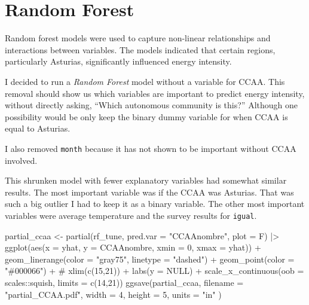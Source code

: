 \documentclass[
]{report}
\newenvironment{Shaded}{\begin{snugshade}}{\end{snugshade}}
\newcommand{\AttributeTok}[1]{\textcolor[rgb]{0.40,0.45,0.13}{#1}}
\newcommand{\CommentTok}[1]{\textcolor[rgb]{0.37,0.37,0.37}{#1}}
\newcommand{\ConstantTok}[1]{\textcolor[rgb]{0.56,0.35,0.01}{#1}}
\newcommand{\DecValTok}[1]{\textcolor[rgb]{0.68,0.00,0.00}{#1}}
\newcommand{\FunctionTok}[1]{\textcolor[rgb]{0.28,0.35,0.67}{#1}}
\newcommand{\NormalTok}[1]{\textcolor[rgb]{0.00,0.23,0.31}{#1}}
\newcommand{\OtherTok}[1]{\textcolor[rgb]{0.00,0.23,0.31}{#1}}
\newcommand{\SpecialCharTok}[1]{\textcolor[rgb]{0.37,0.37,0.37}{#1}}
\newcommand{\StringTok}[1]{\textcolor[rgb]{0.13,0.47,0.30}{#1}}
\begin{document}
\hypertarget{random-forest}{%
\section{Random Forest}\label{random-forest}}

Random forest models were used to capture non-linear relationships and
interactions between variables. The models indicated that certain
regions, particularly Asturias, significantly influenced energy
intensity.

I decided to run a \emph{Random Forest} model without a variable for
CCAA. This removal should show us which variables are important to
predict energy intensity, without directly asking, ``Which autonomous
community is this?'' Although one possibility would be only keep the
binary dummy variable for when CCAA is equal to Asturias.

I also removed \texttt{month} because it has not shown to be important
without CCAA involved.

This shrunken model with fewer explanatory variables had somewhat
similar results. The most important variable was if the CCAA was
Asturias. That was such a big outlier I had to keep it as a binary
variable. The other most important variables were average temperature
and the survey results for \texttt{igual}.

\begin{Shaded}
\begin{Highlighting}[]
\NormalTok{partial\_ccaa }\OtherTok{\textless{}{-}} \FunctionTok{partial}\NormalTok{(rf\_tune, }\AttributeTok{pred.var =} \StringTok{"CCAAnombre"}\NormalTok{, }\AttributeTok{plot =}\NormalTok{ F) }\SpecialCharTok{|\textgreater{}} 
  \FunctionTok{ggplot}\NormalTok{(}\FunctionTok{aes}\NormalTok{(}\AttributeTok{x =}\NormalTok{ yhat, }\AttributeTok{y =}\NormalTok{ CCAAnombre, }\AttributeTok{xmin =} \DecValTok{0}\NormalTok{, }\AttributeTok{xmax =}\NormalTok{ yhat)) }\SpecialCharTok{+}
  \FunctionTok{geom\_linerange}\NormalTok{(}\AttributeTok{color =} \StringTok{"gray75"}\NormalTok{, }\AttributeTok{linetype =} \StringTok{"dashed"}\NormalTok{) }\SpecialCharTok{+}
  \FunctionTok{geom\_point}\NormalTok{(}\AttributeTok{color =} \StringTok{"\#000066"}\NormalTok{) }\SpecialCharTok{+} \CommentTok{\# xlim(c(15,21)) +}
  \FunctionTok{labs}\NormalTok{(}\AttributeTok{y =} \ConstantTok{NULL}\NormalTok{) }\SpecialCharTok{+} \FunctionTok{scale\_x\_continuous}\NormalTok{(}\AttributeTok{oob =}\NormalTok{ scales}\SpecialCharTok{::}\NormalTok{squish, }\AttributeTok{limits =} \FunctionTok{c}\NormalTok{(}\DecValTok{14}\NormalTok{,}\DecValTok{21}\NormalTok{))}
\FunctionTok{ggsave}\NormalTok{(partial\_ccaa, }\AttributeTok{filename =} \StringTok{"partial\_CCAA.pdf"}\NormalTok{, }\AttributeTok{width =} \DecValTok{4}\NormalTok{, }\AttributeTok{height =} \DecValTok{5}\NormalTok{, }\AttributeTok{units =} \StringTok{"in"}\NormalTok{ )}
\end{Highlighting}
\end{Shaded}
\end{document}
